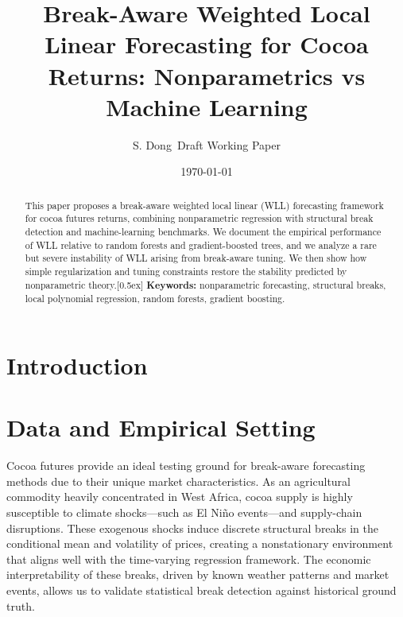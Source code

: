 \documentclass[11pt]{article}
\title{Break-Aware Weighted Local Linear Forecasting\newline
for Cocoa Returns: Nonparametrics vs Machine Learning}
\author{S. Dong\ \small Draft Working Paper}
\date{\today}
\newcommand{\1}{\mathbf{1}}
\begin{document}
\maketitle
\onehalfspacing

\begin{abstract}
This paper proposes a break-aware weighted local linear (WLL) 
forecasting framework for cocoa futures returns,
 combining nonparametric regression with structural break detection and machine-learning benchmarks. We document the empirical performance of WLL relative to random forests and gradient-boosted trees, and we analyze a rare but severe instability of WLL arising from break-aware tuning. We then show how simple regularization and tuning constraints restore the stability predicted by nonparametric theory.[0.5ex]
\textbf{Keywords:} nonparametric forecasting, 
structural breaks, local polynomial regression, random forests,
 gradient boosting.
\end{abstract}

\section{Introduction}
\label{sec:intro}




\section{Data and Empirical Setting}
\label{sec:data}

Cocoa futures provide an ideal testing ground for break-aware forecasting methods due to their unique market characteristics. As an agricultural commodity heavily concentrated in West Africa, cocoa supply is highly susceptible to climate shocks---such as El Ni\~no events---and supply-chain disruptions. These exogenous shocks induce discrete structural breaks in the conditional mean and volatility of prices, creating a nonstationary environment that aligns well with the time-varying regression framework. The economic interpretability of these breaks, driven by known weather patterns and market events, allows us to validate statistical break detection against historical ground truth.
\end{document}
